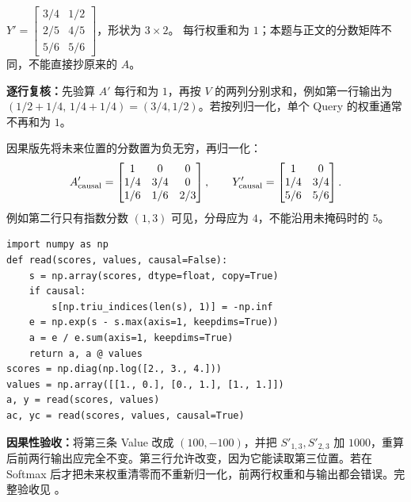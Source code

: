 \begin{enumerate}[label={},leftmargin=4.8em,itemsep=4pt]
$Y'=\boxed{\begin{bmatrix}
3/4&1/2\\
2/5&4/5\\
5/6&5/6
\end{bmatrix}}$，形状为 $3\times2$。
每行权重和为 $1$；本题与正文的分数矩阵不同，不能直接抄原来的 $A$。\par\textbf{逐行复核：}先验算 $A\prime$ 每行和为 $1$，再按 $V$ 的两列分别求和，例如第一行输出为 $(1/2+1/4,\,1/4+1/4)=(3/4,1/2)$。若按列归一化，单个 Query 的权重通常不再和为 $1$。
\par 因果版先将未来位置的分数置为负无穷，再归一化：
\[
A'_{\rm causal}=\begin{bmatrix}1&0&0\\1/4&3/4&0\\1/6&1/6&2/3\end{bmatrix},\qquad
Y'_{\rm causal}=\begin{bmatrix}1&0\\1/4&3/4\\5/6&5/6\end{bmatrix}.
\]
例如第二行只有指数分数 $(1,3)$ 可见，分母应为 $4$，不能沿用未掩码时的 $5$。\par\nobreak
\begin{samepage}\begin{verbatim}
import numpy as np
def read(scores, values, causal=False):
    s = np.array(scores, dtype=float, copy=True)
    if causal:
        s[np.triu_indices(len(s), 1)] = -np.inf
    e = np.exp(s - s.max(axis=1, keepdims=True))
    a = e / e.sum(axis=1, keepdims=True)
    return a, a @ values
scores = np.diag(np.log([2., 3., 4.]))
values = np.array([[1., 0.], [0., 1.], [1., 1.]])
a, y = read(scores, values)
ac, yc = read(scores, values, causal=True)
\end{verbatim}\end{samepage}
\textbf{因果性验收：}将第三条 Value 改成 $(100,-100)$，并把 $S'_{1,3},S'_{2,3}$ 加 $1000$，重算后前两行输出应完全不变。第三行允许改变，因为它能读取第三位置。若在 Softmax 后才把未来权重清零而不重新归一化，前两行权重和与输出都会错误。完整验收见 。
\end{enumerate}
